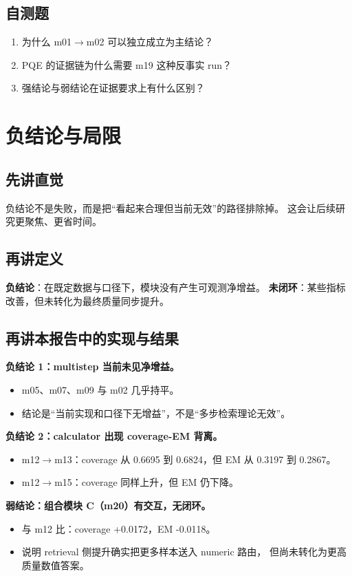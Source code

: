 \documentclass[UTF8,a4paper,12pt]{ctexart}
\begin{document}
\subsection{自测题}
\begin{enumerate}
  \item 为什么 m01$\rightarrow$m02 可以独立成立为主结论？
  \item PQE 的证据链为什么需要 m19 这种反事实 run？
  \item 强结论与弱结论在证据要求上有什么区别？
\end{enumerate}

\section{负结论与局限}
\subsection{先讲直觉}
负结论不是失败，而是把“看起来合理但当前无效”的路径排除掉。
这会让后续研究更聚焦、更省时间。

\subsection{再讲定义}
\textbf{负结论}：在既定数据与口径下，模块没有产生可观测净增益。  
\textbf{未闭环}：某些指标改善，但未转化为最终质量同步提升。

\subsection{再讲本报告中的实现与结果}
\textbf{负结论 1：multistep 当前未见净增益。}
\begin{itemize}
  \item m05、m07、m09 与 m02 几乎持平。
  \item 结论是“当前实现和口径下无增益”，不是“多步检索理论无效”。
\end{itemize}

\textbf{负结论 2：calculator 出现 coverage-EM 背离。}
\begin{itemize}
  \item m12$\rightarrow$m13：coverage 从 0.6695 到 0.6824，但 EM 从 0.3197 到 0.2867。
  \item m12$\rightarrow$m15：coverage 同样上升，但 EM 仍下降。
\end{itemize}

\textbf{弱结论：组合模块 C（m20）有交互，无闭环。}
\begin{itemize}
  \item 与 m12 比：coverage +0.0172，EM -0.0118。
  \item 说明 retrieval 侧提升确实把更多样本送入 numeric 路由，
  但尚未转化为更高质量数值答案。
\end{itemize}
\end{document}
